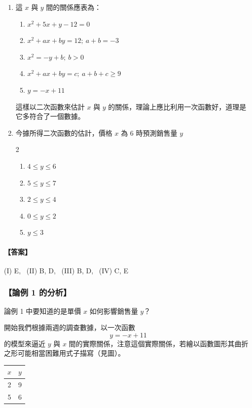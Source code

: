 \begin{discussion}[複選題]
\begin{enumerate}[label=(\Roman*), leftmargin=2.5em]
  \item 這 $x$ 與 $y$ 間的關係應表為：
  \begin{enumerate}[label=(\Alph*)]
    \item $x^2 + 5x + y - 12 = 0$
    \item $x^2 + ax + by = 12;\ a+b=-3$
    \item $x^2 = -y+b;\ b>0$
    \item $x^2 + ax + by = c;\ a+b+c \ge 9$
    \item $y = -x+11$
  \end{enumerate}

  這樣以二次函數來估計 $x$ 與 $y$ 的關係，理論上應比利用一次函數好，道理是它多符合了一個數據。

  \item 今據所得二次函數的估計，價格 $x$ 為 6 時預測銷售量 $y$
  \begin{multicols}{2}
  \begin{enumerate}[label=(\Alph*)]
    \item $4 \le y \le 6$
    \item $5 \le y \le 7$
    \item $2 \le y \le 4$
    \item $0 \le y \le 2$
    \item $y \le 3$
  \end{enumerate}
  \end{multicols}
\end{enumerate}

\paragraph{【答案】} (I) E, \ (II) B, D, \ (III) B, D, \ (IV) C, E
\end{discussion}

\subsubsection*{【論例 1 的分析】}

論例 1 中要知道的是單價 $x$ 如何影響銷售量 $y$？

開始我們根據兩週的調查數據，以一次函數
\[ y = -x+11 \]
的模型來逼近 $y$ 與 $x$ 間的實際關係，注意這個實際關係，若繪以函數圖形其曲折之形可能相當困難用式子描寫（見圖）。

\begin{center}
\renewcommand{\arraystretch}{1.2}
\begin{tabular}{|c|c|}
\hline
$x$ & $y$ \\ \hline
2 & 9 \\
5 & 6 \\ \hline
\end{tabular}
\end{center}

